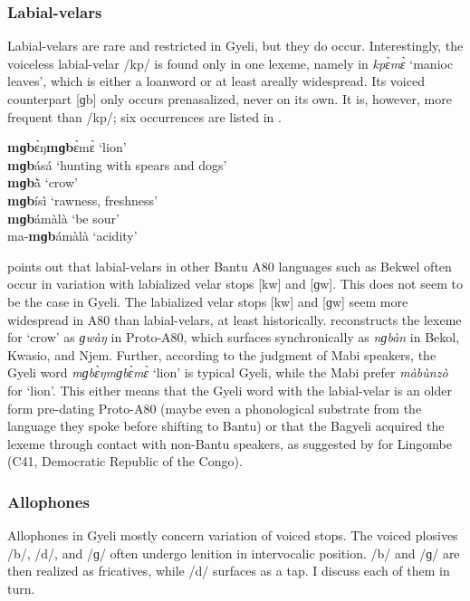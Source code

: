 \subsubsection{Labial-velars}
\label{sec:LabV}

Labial-velars are rare and restricted in Gyeli, but they do occur. Interestingly, the voiceless labial-velar /kp/ is found only in one lexeme, namely in {\itshape kpɛ̀mɛ̀} `manioc leaves', which is either a loanword or at least areally widespread. Its voiced counterpart [ɡb] only occurs prenasalized, never on its own. It is, however, more frequent than /kp/; six occurrences are listed in .

\newpage

\ea \label{mgb}
{\bfseries mɡb}ɛ̀ŋ{\bfseries mɡb}ɛ̀mɛ̀ `lion' \\
{\bfseries mɡb}ásá `hunting with spears and dogs' \\
{\bfseries mɡb}ã̀ `crow' \\
{\bfseries mɡb}ísì `rawness, freshness' \\
{\bfseries mɡb}ámàlà `be sour' \\
ma-{\bfseries mɡb}ámàlà `acidity'
\z

\citet[148]{cheucle2014} points out that labial-velars in other Bantu A80 languages such as Bekwel often occur in variation with labialized velar stops [kw] and [ɡw]. This does not seem to be the case in Gyeli.
The labialized velar stops [kw] and [ɡw] seem more widespread in A80 than labial-velars, at least historically.  \citet[503]{cheucle2014} reconstructs the lexeme for `crow' as {\itshape *ɡwàŋ} in Proto-A80, which surfaces synchronically as {\itshape nɡbàn} in Bekol, Kwasio, and Njem. Further, according to the judgment of Mabi speakers, the Gyeli word {\itshape mɡbɛ̀ŋmɡbɛ̀mɛ̀} `lion' is typical Gyeli, while the Mabi prefer {\itshape màbùnzò} for `lion'. This either means that the Gyeli word with the labial-velar is an older form pre-dating Proto-A80 (maybe even a phonological substrate from the language they spoke before shifting to Bantu) or that the Bagyeli acquired the lexeme through contact with  non-Bantu speakers, as suggested by \citet{bostoen2013} for Lingombe (C41, Democratic Republic of the Congo).


\subsubsection{Allophones}
\label{sec:Allo}

Allophones in Gyeli mostly concern variation of voiced stops. The voiced plosives /b/, /d/, and /ɡ/ often undergo lenition in intervocalic position. /b/ and /ɡ/ are then realized as fricatives, while /d/ surfaces as a tap. I discuss each of them in turn. 




